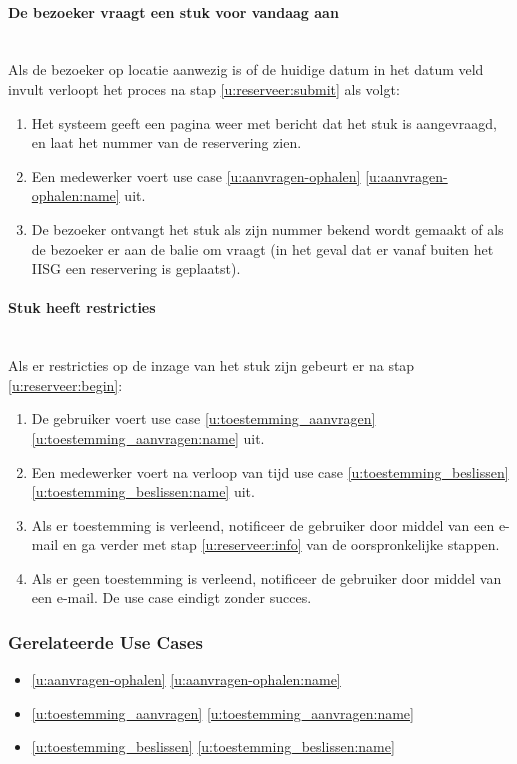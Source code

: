 \documentclass[a4paper,titlepage]{report}
\def\namedref#1{\ref{#1} \ref{#1:name}}
\begin{document}
        \paragraph{De bezoeker vraagt een stuk voor vandaag aan}\hfill\\
          Als de bezoeker op locatie aanwezig is of de huidige datum in het
          datum veld invult verloopt het proces na stap
          \ref{u:reserveer:submit} als volgt:
          \begin{enumerate}
            \item Het systeem geeft een pagina weer met bericht dat het stuk is
              aangevraagd, en laat het nummer van de reservering zien.
            \item Een medewerker voert use case \namedref{u:aanvragen-ophalen}
              uit.
            \item De bezoeker ontvangt het stuk als zijn nummer bekend wordt
              gemaakt of als de bezoeker er aan de balie om vraagt (in het
              geval dat er vanaf buiten het IISG een reservering is geplaatst).
          \end{enumerate}

        \paragraph{Stuk heeft restricties}\hfill\\
          Als er restricties op de inzage van het stuk zijn gebeurt er na stap
          \ref{u:reserveer:begin}:

          \begin{enumerate}
            \item De gebruiker voert use case
              \namedref{u:toestemming_aanvragen} uit.
            \item Een medewerker voert na verloop van tijd use case
            \namedref{u:toestemming_beslissen} uit.
            \item Als er toestemming is verleend, notificeer de gebruiker door
              middel van een e-mail en ga verder met stap
              \ref{u:reserveer:info} van de oorspronkelijke stappen.
            \item Als er geen toestemming is verleend, notificeer de gebruiker
              door middel van een e-mail. De use case eindigt zonder succes.
          \end{enumerate}
      \subsubsection{Gerelateerde Use Cases}
        \begin{itemize}
          \item \namedref{u:aanvragen-ophalen}
          \item \namedref{u:toestemming_aanvragen}
          \item \namedref{u:toestemming_beslissen}
        \end{itemize}
\end{document}
